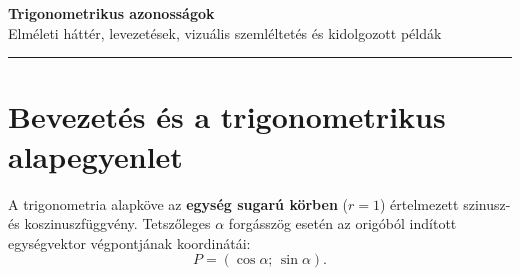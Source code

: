 \documentclass[11pt,a4paper]{article}
\begin{document}
\begin{center}
    {\huge\bfseries\sffamily\color{matekKek} Trigonometrikus azonosságok}\\[2mm]
    {\large\sffamily Elméleti háttér, levezetések, vizuális szemléltetés és kidolgozott példák}\\[1mm]
    \rule{\textwidth}{1.5pt}
\end{center}

\vspace{2mm}

\section{Bevezetés és a trigonometrikus alapegyenlet}

A trigonometria alapköve az \textbf{egység sugarú körben} ($r = 1$) értelmezett szinusz- és koszinuszfüggvény. Tetszőleges $\alpha$ forgásszög esetén az origóból indított egységvektor végpontjának koordinátái:
\[
P = (\cos\alpha;\, \sin\alpha).
\]
\end{document}
